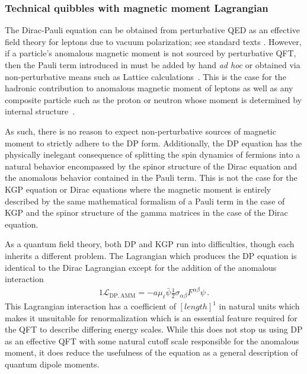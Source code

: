 \subsubsection{Technical quibbles with magnetic moment Lagrangian}
The Dirac-Pauli equation can be obtained from perturbative QED as an effective field theory for leptons due to vacuum polarization; see standard texts \cite{Itzykson:1980rh,Schwartz:2014sze}. However, if a particle's anomalous magnetic moment is not sourced by perturbative QFT, then the Pauli term introduced in  must be added by hand \emph{ad hoc} or obtained via non-perturbative means such as Lattice calculations~\citep{Aoyama:2020ynm}. This is the case for the hadronic contribution to anomalous magnetic moment of leptons as well as any composite particle such as the proton or neutron whose moment is determined by internal structure~\citep{Proceedings:2012ulb}.

As such, there is no reason to expect non-perturbative sources of magnetic moment to strictly adhere to the DP form. Additionally, the DP equation has the physically inelegant consequence of splitting the spin dynamics of fermions into a natural behavior encompassed by the spinor structure of the Dirac equation and the anomalous behavior contained in the Pauli term. This is not the case for the KGP equation or Dirac equations where the magnetic moment is entirely described by the same mathematical formalism of a Pauli term in the case of KGP and the spinor structure of the gamma matrices in the case of the Dirac equation.

As a quantum field theory, both DP and KGP run into difficulties, though each inherits a different problem. The Lagrangian which produces the DP equation is identical to the Dirac Lagrangian except for the addition of the anomalous interaction
\begin{alignat}{1}
	\label{eq:problems01} \mathcal{L}_{\mathrm{DP,AMM}}=-a\mu_{\ell}\bar{\psi}\frac{1}{2}\sigma_{\alpha\beta}F^{\alpha\beta}\psi\,.
\end{alignat}
This Lagrangian interaction has a coefficient of $[length]^{1}$ in natural units which makes it unsuitable for renormalization which is an essential feature required for the QFT to describe differing energy scales. While this does not stop us using DP as an effective QFT with some natural cutoff scale responsible for the anomalous moment, it does reduce the usefulness of the equation as a general description of quantum dipole moments.

